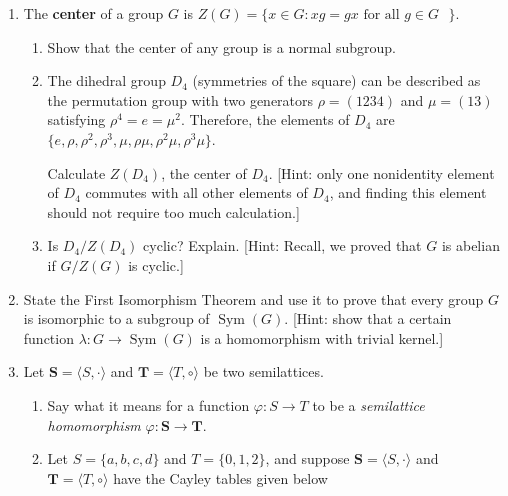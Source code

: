 \documentclass[fleqn,12pt]{article}
\newcommand{\<}{\ensuremath{\langle}}
\renewcommand{\>}{\ensuremath{\rangle}}
\newcommand{\bS}{\ensuremath{\mathbf{S}}}
\newcommand{\bT}{\ensuremath{\mathbf{T}}}
\begin{document}
\begin{enumerate}[{\bf 1.}]
\newpage

\item The {\bf center} of a group $G$ is
$Z(G) = \{ x \in G : xg = gx \text{ for all $g \in G$ }\}$.

\begin{enumerate}
 \item
Show that the center of any group is a normal subgroup.
 \vskip7cm

\item
The dihedral group $D_4$ (symmetries of the square) can be
described as the permutation group with two generators 
$\rho = (1234)$ and $\mu = (13)$ satisfying $\rho^4= e = \mu^2$.
Therefore, the elements of $D_4$ are 
$\{e, \rho, \rho^2, \rho^3, \mu, \rho \mu, \rho^2 \mu, \rho^3 \mu\}$.

Calculate $Z(D_4)$, the center of $D_4$. [Hint: only one nonidentity
element of $D_4$ commutes with all other elements of $D_4$, and finding
this element should not require too much calculation.]
 
 \vskip7cm

 
 \item
Is $D_4/Z(D_4)$ cyclic?  Explain. [Hint: Recall, we proved that 
$G$ is abelian if $G/Z(G)$ is cyclic.]
\end{enumerate}
\newpage
\item State the First Isomorphism Theorem and use it to prove that every group $G$
  is isomorphic to a subgroup of $\operatorname{Sym}(G)$. [Hint: show that a certain function
    $\lambda :G \rightarrow \operatorname{Sym}(G)$ is a homomorphism with trivial kernel.]

\newpage

\item Let $\bS = \<S, \cdot\>$ and $\bT = \<T, \circ\>$ be two semilattices.
  \begin{enumerate}
  \item Say what it means for a function $\varphi: S \rightarrow T$ to be a
    \emph{semilattice homomorphism} $\varphi: \bS \rightarrow \bT$.
\vskip3cm
\item Let $S = \{a, b, c, d\}$ and $T = \{0, 1, 2\}$, and suppose 
  $\bS = \<S, \cdot\>$ and
  $\bT= \<T, \circ\>$ have the Cayley tables given below


\end{enumerate}
\end{enumerate}
\end{document}

